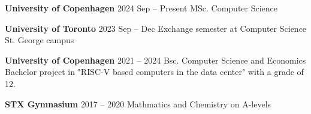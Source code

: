 \resumeSubHeadingListStart

\resumeProjectHeading
{\textbf{University of Copenhagen}\vspace{8pt} }{2024 Sep -- Present}
\small{MSc. Computer Science}

\resumeProjectHeading
{\textbf{University of Toronto}\vspace{8pt} }{2023 Sep -- Dec}
\small{Exchange semester at Computer Science St. George campus}

\resumeProjectHeading
{\textbf{University of Copenhagen} \vspace{8pt}}{2021 -- 2024}
\small{Bsc. Computer Science and Economics}\\
\small{
	Bachelor project in "RISC-V based computers in the data center" with a grade
	of 12.
}

\resumeProjectHeading
{\textbf{STX Gymnasium} \vspace{8pt}}{2017 -- 2020}
\small{Mathmatics and Chemistry on A-levels}

\resumeSubHeadingListEnd
